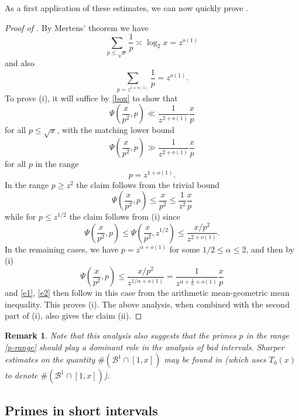 \documentclass[12pt]{amsart}
\newtheorem{remark}[theorem]{Remark}
\begin{document}
As a first application of these estimates, we can now quickly prove .

\begin{proof}[Proof of ] By Mertens' theorem we have
$$\sum_{p \leq \sqrt{x}} \frac{1}{p} \asymp \log_2 x = z^{o(1)}$$
and also
$$\sum_{p = z^{1+o(1)}} \frac{1}{p} = z^{o(1)}.$$
To prove (i), it will suffice by \eqref{box} to show that
\begin{equation}\label{e1}
 \Psi\left(\frac{x}{p^2}, p\right) \ll \frac{1}{z^{2+o(1)}} \frac{x}{p}
\end{equation}
for all $p \leq \sqrt{x}$, with the matching lower bound
\begin{equation}\label{e2}
 \Psi\left(\frac{x}{p^2}, p\right) \gg \frac{1}{z^{2+o(1)}} \frac{x}{p}
\end{equation}
for all $p$ in the range
\begin{equation}\label{p-range}
p = z^{1+o(1)}.
\end{equation}
In the range $p \geq z^2$ the claim follows from the trivial bound
$$ \Psi\left(\frac{x}{p^2}, p\right) \leq \frac{x}{p^2} \leq \frac{1}{z^2} \frac{x}{p}$$
while for $p \leq z^{1/2}$ the claim follows from (i) since
$$ \Psi\left(\frac{x}{p^2}, p\right) \leq \Psi\left(\frac{x}{p^2}, z^{1/2}\right) \leq \frac{x/p^2}{z^{2+o(1)}}.$$
In the remaining cases, we have $p = z^{\alpha+o(1)}$ for some $1/2 \leq \alpha \leq 2$, and then by (i)
$$ \Psi\left(\frac{x}{p^2}, p\right) \leq \frac{x/p^2}{z^{1/\alpha+o(1)}} = \frac{1}{z^{\alpha+\frac{1}{\alpha}+o(1)}} \frac{x}{p}$$
and \eqref{e1}, \eqref{e2} then follow in this case from the arithmetic mean-geometric mean inequality.  This proves (i). The above analysis, when combined with the second part of (i), also gives the claim (ii).
\end{proof}

\begin{remark}
Note that this analysis also suggests that the primes $p$ in the range \eqref{p-range} should play a dominant role in the analysis of bad intervals.  Sharper estimates on the quantity $\# ({\mathcal B}^1 \cap [1,x])$ may be found in \cite{ivic} (which uses $T_0(x)$ to denote $\# ({\mathcal B}^1 \cap [1,x])$).
\end{remark}

\subsection{Primes in short intervals}
\end{document}
